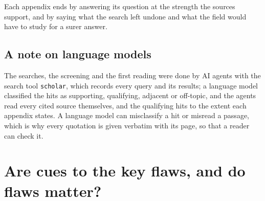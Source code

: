 Each appendix ends by answering its question at the strength the sources
support, and by saying what the search left undone and what the field
would have to study for a surer answer.

\section{A note on language models}

The searches, the screening and the first reading were done by AI agents
with the search tool \texttt{scholar}, which records every query and its
results; a language model classified the hits as supporting, qualifying,
adjacent or off-topic, and the agents read every cited source themselves,
and the qualifying hits to the extent each appendix states.  A language
model can misclassify a hit or misread a passage, which is why every
quotation is given verbatim with its page, so that a reader can check it.


\chapter{Are cues to the key flaws, and do flaws matter?}
\label{app:item-flaws}

